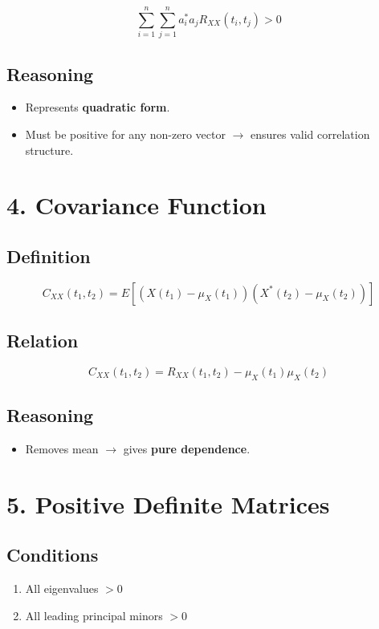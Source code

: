 \documentclass[12pt]{article}
\begin{document}
\[
\sum_{i=1}^n \sum_{j=1}^n a_i^* a_j R_{XX}(t_i,t_j) > 0
\]

\subsection*{Reasoning}

\begin{itemize}
\item Represents \textbf{quadratic form}.
\item Must be positive for any non-zero vector $\rightarrow$ ensures valid correlation structure.
\end{itemize}

\section*{4. Covariance Function}

\subsection*{Definition}

\[
C_{XX}(t_1,t_2) = E[(X(t_1)-\mu_X(t_1))(X^*(t_2)-\mu_X(t_2))]
\]

\subsection*{Relation}

\[
C_{XX}(t_1,t_2) = R_{XX}(t_1,t_2) - \mu_X(t_1)\mu_X(t_2)
\]

\subsection*{Reasoning}

\begin{itemize}
\item Removes mean $\rightarrow$ gives \textbf{pure dependence}.
\end{itemize}

\section*{5. Positive Definite Matrices}

\subsection*{Conditions}

\begin{enumerate}
\item All eigenvalues $> 0$
\item All leading principal minors $> 0$
\end{enumerate}
\end{document}

